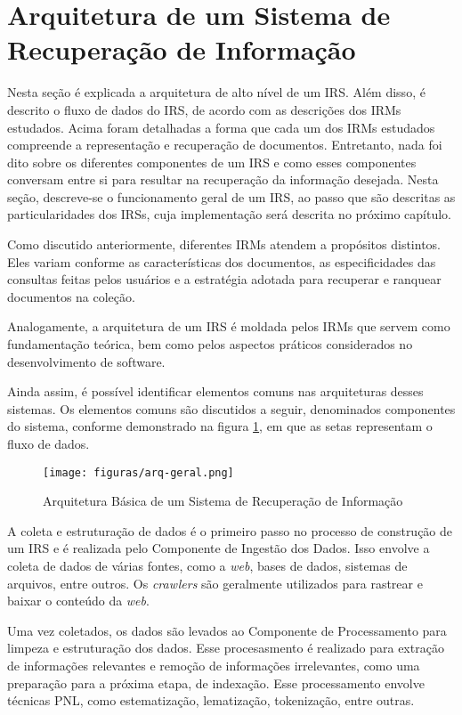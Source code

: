 \documentclass[
	12pt,				%
	openright,			%
	oneside,			%
	a4paper,			%
	english,			%
	french,				%
	spanish,			%
	brazil				%
	]{abntex2}
\begin{document}
\section{Arquitetura de um Sistema de Recuperação de Informação}
\label{sec:arquitetura-de-um-sistema-de-recuperacao-de-informacao}

Nesta seção é explicada a arquitetura de alto nível de um IRS. Além disso, é descrito o fluxo de dados do IRS, de acordo com as descrições dos IRMs estudados.
Acima foram detalhadas a forma que cada um dos IRMs estudados compreende a representação e recuperação de documentos.
Entretanto, nada foi dito sobre os diferentes componentes de um IRS e como esses componentes conversam entre si para resultar na recuperação da informação desejada.
Nesta seção, descreve-se o funcionamento geral de um IRS, ao passo que são descritas as particularidades dos IRSs, cuja implementação será descrita no próximo capítulo.

Como discutido anteriormente, diferentes IRMs atendem a propósitos distintos. Eles variam conforme as características dos documentos, as especificidades das consultas feitas pelos usuários e a estratégia adotada para recuperar e ranquear documentos na coleção.

Analogamente, a arquitetura de um IRS é moldada pelos IRMs que servem como fundamentação teórica, bem como pelos aspectos práticos considerados no desenvolvimento de software.

Ainda assim, é possível identificar elementos
comuns nas arquiteturas desses sistemas.
Os elementos comuns são discutidos a seguir, denominados componentes do sistema, conforme demonstrado na figura \ref{fig:irs-arquitetura},
em que as setas representam o fluxo de dados.

\begin{figure}
    \centering
    \texttt{[image: figuras/arq-geral.png]}
    \caption{Arquitetura Básica de um Sistema de Recuperação de Informação}
    \label{fig:irs-arquitetura}
\end{figure}

A coleta e estruturação de dados é o primeiro passo no processo de construção de um IRS e é realizada pelo Componente de Ingestão dos Dados.
Isso envolve a coleta de dados de várias fontes, como a \textit{web}, bases de dados, sistemas de arquivos, entre outros.
Os \textit{crawlers} são geralmente utilizados para rastrear e baixar o conteúdo da \textit{web}.

Uma vez coletados, os dados são levados ao Componente de Processamento para limpeza e estruturação dos dados. Esse procesasmento é realizado para extração de informações relevantes e remoção de informações irrelevantes, como uma preparação para a próxima etapa, de indexação. Esse processamento envolve técnicas PNL, como estematização, lematização, tokenização, entre outras.
\end{document}
